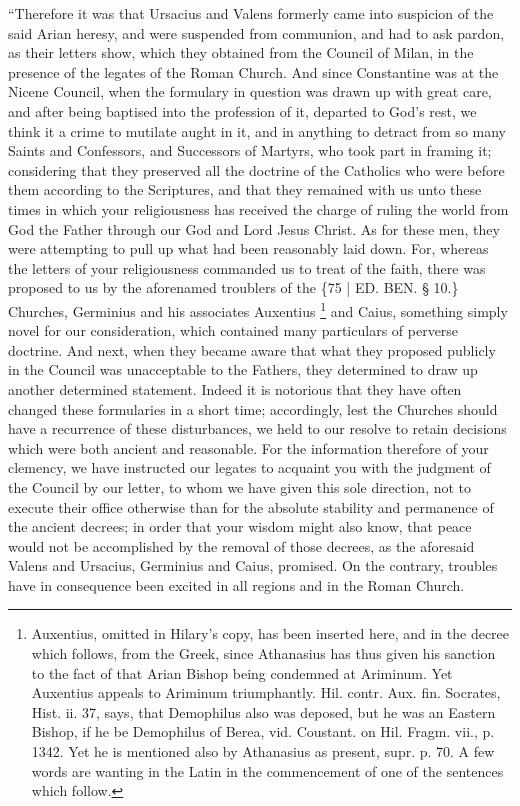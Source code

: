 ``Therefore it was that
Ursacius and Valens formerly came into suspicion of the said Arian
heresy, and were suspended from communion, and had to ask pardon, as
their letters show, which they obtained from the Council of Milan, in
the presence of the legates of the Roman Church. And since Constantine
was at the Nicene Council, when the formulary in question was drawn up
with great care, and after being baptised into the profession of it,
departed to God's rest, we think it a crime to mutilate aught in it,
and in anything to detract from so many Saints and Confessors, and
Successors of Martyrs, who took part in framing it; considering that
they preserved all the doctrine of the Catholics who were before them
according to the Scriptures, and that they remained with us unto these
times in which your religiousness has received the charge of ruling
the world from God the Father through our God and Lord Jesus Christ.
As for these men, they were attempting to pull up what had been
reasonably laid down. For, whereas the letters of your religiousness
commanded us to treat of the faith, there was proposed to us by the
aforenamed troublers of the \{75 | ED. BEN.
§ 10.\} Churches, Germinius and his associates Auxentius \footnote{Auxentius, omitted in Hilary's copy, has been inserted here, and in
the decree which follows, from the Greek, since Athanasius has thus
given his sanction to the fact of that Arian Bishop being condemned at
Ariminum. Yet Auxentius appeals to Ariminum triumphantly. Hil. contr.
Aux. fin. Socrates, Hist. ii. 37, says, that Demophilus also was
deposed, but he was an Eastern Bishop, if he be Demophilus of Berea,
vid. Coustant. on Hil. Fragm. vii., p. 1342. Yet he is mentioned also
by Athanasius as present, supr. p. 70. A few words are wanting in the
Latin in the commencement of one of the sentences which follow.} and Caius, something simply novel for our consideration, which
contained many particulars of perverse doctrine. And next, when they
became aware that what they proposed publicly in the Council was
unacceptable to the Fathers, they determined to draw up another
determined statement. Indeed it is notorious that they have often
changed these formularies in a short time; accordingly, lest the
Churches should have a recurrence of these disturbances, we held to
our resolve to retain decisions which were both ancient and
reasonable. For the information therefore of your clemency, we have
instructed our legates to acquaint you with the judgment of the
Council by our letter, to whom we have given this sole direction, not
to execute their office otherwise than for the absolute stability and
permanence of the ancient decrees; in order that your wisdom might
also know, that peace would not be accomplished by the removal of
those decrees, as the aforesaid Valens and Ursacius, Germinius and
Caius, promised. On the contrary, troubles have in consequence been
excited in all regions and in the Roman Church.

